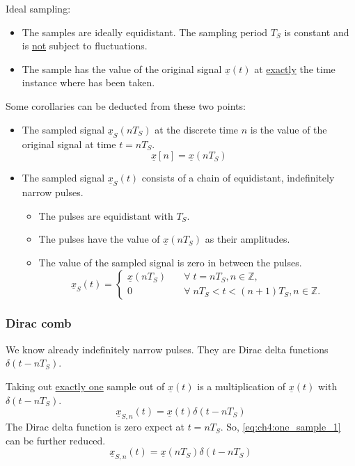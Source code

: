 \begin{refsection}
Ideal sampling:
\begin{itemize}
	\item The samples are ideally equidistant. The sampling period $T_S$ is constant and is \underline{not} subject to fluctuations.
	\item The sample has the value of the original signal $\underline{x}(t)$ at \underline{exactly} the time instance where has been taken.
\end{itemize}
Some corollaries can be deducted from these two points:
\begin{itemize}
	\item The sampled signal $\underline{x}_S(n T_S)$ at the discrete time $n$ is the value of the original signal at time $t = n T_S$.
	\begin{equation}
		\underline{x}[n] = \underline{x}\left(n T_S\right)
	\end{equation}
	\item The sampled signal $\underline{x}_S(t)$ consists of a chain of equidistant, indefinitely narrow pulses.
	\begin{itemize}
		\item The pulses are equidistant with $T_S$.
		\item The pulses have the value of $\underline{x}\left(n T_S\right)$ as their amplitudes.
		\item The value of the sampled signal is zero in between the pulses.
		\begin{equation}
			\underline{x}_S(t) = \begin{cases}
				\underline{x}\left(n T_S\right) & \quad \forall \; t = n T_S, n \in \mathbb{Z}, \\
				0 & \quad \forall \; n T_S < t < \left(n+1\right) T_S, n \in \mathbb{Z}.
			\end{cases}
		\end{equation}
	\end{itemize}
\end{itemize}

\subsubsection{Dirac comb}

We know already indefinitely narrow pulses. They are Dirac delta functions $\delta\left(t - n T_S\right)$.

Taking out \underline{exactly one} sample out of $\underline{x}(t)$ is a multiplication of $\underline{x}(t)$ with $\delta\left(t - n T_S\right)$.
\begin{equation}
	\underline{x}_{S,n}(t) = \underline{x}(t) \delta\left(t - n T_S\right)
	\label{eq:ch4:one_sample_1}
\end{equation}
The Dirac delta function is zero expect at $t = n T_S$. So, \eqref{eq:ch4:one_sample_1} can be further reduced.
\begin{equation}
	\underline{x}_{S,n}(t) = \underline{x}(n T_S) \delta\left(t - n T_S\right)
	\label{eq:ch4:one_sample_2}
\end{equation}


\end{refsection}
